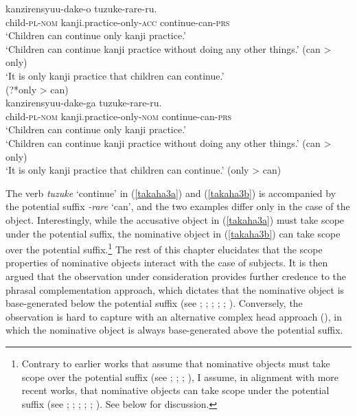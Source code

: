 \documentclass[output=paper]{langscibook}
\begin{document}
\begin{exe}
\ex 

\begin{xlist}

\ex \label{takaha3a}
 {kanzirensyuu-dake-o} {tuzuke-rare-ru.}\\
	child-\textsc{pl}-\textsc{nom}       kanji.practice-only-\textsc{acc} continue-can-\textsc{prs}\\
\glt ‘Children can continue only kanji practice.’\\
	‘Children can continue kanji practice without doing any other things.’ (can \textgreater{} only)\\
 	`It is only kanji practice that children can continue.’\\
(?*only \textgreater{} can)
\\

\ex \label{takaha3b}
 {kanzirensyuu-dake-ga} {tuzuke-rare-ru.}\\
	child-\textsc{pl}-\textsc{nom}       kanji.practice-only-\textsc{nom} continue-can-\textsc{prs}\\
\glt `Children can continue only kanji practice.’\\
`Children can continue kanji practice without doing any other things.' (can \textgreater{} only)\\
`It is only kanji practice that children can continue.’ (only \textgreater{} can)

\end{xlist}
\end{exe}

The verb \emph{tuzuke} ‘continue’ in (\ref{takaha3a}) and (\ref{takaha3b}) is accompanied by the potential suffix \emph{-rare} ‘can’, and the two examples differ only in the case of the object. Interestingly, while the accusative object in (\ref{takaha3a}) must take scope under the potential suffix, the nominative object in (\ref{takaha3b}) can take scope over the potential suffix.\footnote{Contrary to earlier works that assume that nominative objects must take scope over the potential suffix (see \citealt{Tada1992}; \citealt{Koizumi1998}; \citealt{SaitoHoshi1998}; \citealt{Takano2003}), I assume, in alignment with more recent works, that nominative objects can take scope under the potential suffix (see \citealt{nomura2005}; \citealt{Koizumi2008}; \citealt{takahashi2011}; \citealt{FunakoshiTakahashi2014}; \citealt{ochisaruwatari2014a}; \citealt{kasai2018}). See below for discussion.} The rest of this chapter elucidates that the scope properties of nominative objects interact with the case of subjects. It is then argued that the observation under consideration provides further credence to the phrasal complementation approach, which dictates that the nominative object is base-generated below the potential suffix (see \citealt{wurmbrand2001}; \citealt{bobaljikwurmbrand2005,bobaljikwurmbrand2007}; \citealt{nomura2005}; \citealt{Takano2011}; \citealt{FunakoshiTakahashi2014}; \citealt{shimamurawurmbrand2014}). Conversely, the observation is hard to capture with an alternative complex head approach (\citealt{SaitoHoshi1998}), in which the nominative object is always base-generated above the potential suffix.
\end{document}
